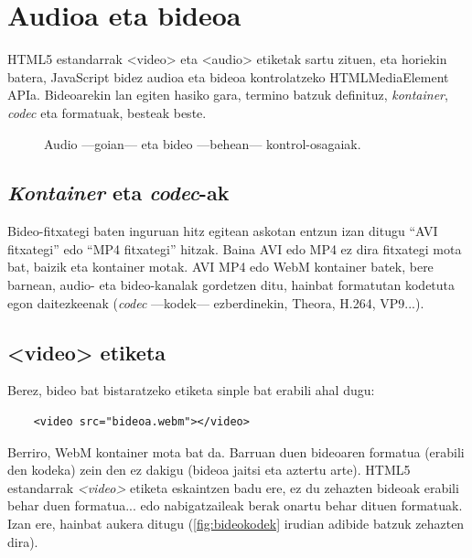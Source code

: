 \chapter{Audioa eta bideoa}

HTML5 estandarrak <video> eta <audio> etiketak sartu zituen, eta horiekin batera, JavaScript bidez audioa eta bideoa kontrolatzeko HTMLMediaElement APIa. Bideoarekin lan egiten hasiko gara, termino batzuk definituz, \textit{kontainer}, \textit{codec} eta formatuak, besteak beste. 


\begin{figure}[ht]
	\centering
{}
\caption{Audio —goian— eta bideo —behean— kontrol-osagaiak.}
\label{fig:bideocontrols}
\end{figure}

\section{\textit{Kontainer} eta \textit{codec}-ak}
Bideo-fitxategi baten inguruan hitz egitean askotan entzun izan ditugu ``AVI fitxategi'' edo ``MP4 fitxategi'' hitzak. Baina AVI edo MP4 ez dira fitxategi mota bat, baizik eta kontainer motak. AVI MP4 edo WebM  kontainer batek, bere barnean, audio- eta bideo-kanalak gordetzen ditu, hainbat formatutan kodetuta egon daitezkeenak (\textit{codec} —kodek— ezberdinekin, Theora, H.264, VP9...).

\section{<video> etiketa}

Berez, bideo bat bistaratzeko etiketa sinple bat erabili ahal dugu:

\begin{verbatim}
    <video src="bideoa.webm"></video>
\end{verbatim}

Berriro, WebM kontainer mota bat da. Barruan duen bideoaren formatua (erabili den kodeka) zein den ez dakigu (bideoa jaitsi eta aztertu arte). HTML5 estandarrak \textit{<video>} etiketa eskaintzen badu ere, ez du zehazten bideoak erabili behar duen formatua... edo nabigatzaileak berak onartu behar dituen formatuak. Izan ere, hainbat aukera ditugu (\ref{fig:bideokodek} irudian adibide batzuk zehazten dira).

